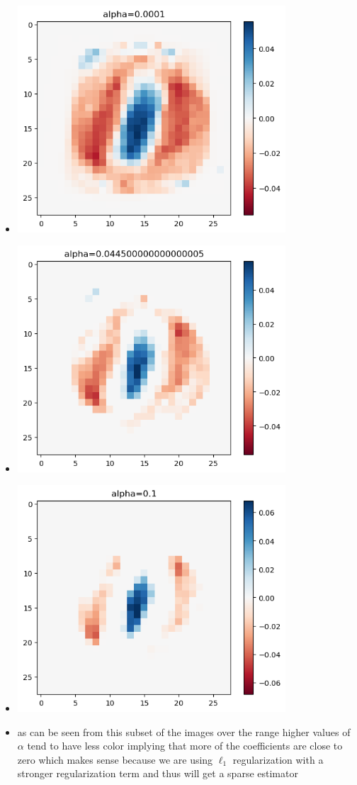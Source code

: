 \documentclass{article}
\begin{document}
\begin{enumerate}
  \begin{itemize}
    \item \includegraphics[width=10cm]{homework/homework_2/immages/32_1.png}
    \item \includegraphics[width=10cm]{homework/homework_2/immages/32_2.png}
    \item \includegraphics[width=10cm]{homework/homework_2/immages/32_3.png}
    \item as can be seen from this subset of the images over the range 
       higher values of $\alpha$ tend to have less color implying that more of the coefficients are close to zero which makes sense because we are using $\ell_{1}$ regularization with a stronger regularization term and thus will get a sparse estimator
  \end{itemize}

  
\setcounter{saveenum}{\value{enumi}}
\end{enumerate}
\end{document}
